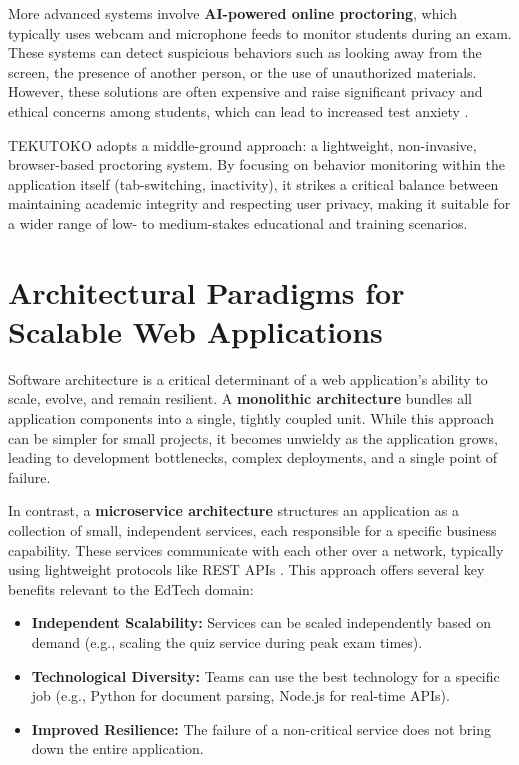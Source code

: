 More advanced systems involve \textbf{AI-powered online proctoring}, which typically uses webcam and microphone feeds to monitor students during an exam. These systems can detect suspicious behaviors such as looking away from the screen, the presence of another person, or the use of unauthorized materials. However, these solutions are often expensive and raise significant privacy and ethical concerns among students, which can lead to increased test anxiety \citep{ullah2021}.

TEKUTOKO adopts a middle-ground approach: a lightweight, non-invasive, browser-based proctoring system. By focusing on behavior monitoring within the application itself (tab-switching, inactivity), it strikes a critical balance between maintaining academic integrity and respecting user privacy, making it suitable for a wider range of low- to medium-stakes educational and training scenarios.

\section{Architectural Paradigms for Scalable Web Applications}
\label{sec:lit-architecture}
Software architecture is a critical determinant of a web application's ability to scale, evolve, and remain resilient. A \textbf{monolithic architecture} bundles all application components into a single, tightly coupled unit. While this approach can be simpler for small projects, it becomes unwieldy as the application grows, leading to development bottlenecks, complex deployments, and a single point of failure.

In contrast, a \textbf{microservice architecture} structures an application as a collection of small, independent services, each responsible for a specific business capability. These services communicate with each other over a network, typically using lightweight protocols like REST APIs \citep{newman2015}. This approach offers several key benefits relevant to the EdTech domain:
\begin{itemize}
    \item \textbf{Independent Scalability:} Services can be scaled independently based on demand (e.g., scaling the quiz service during peak exam times).
    \item \textbf{Technological Diversity:} Teams can use the best technology for a specific job (e.g., Python for document parsing, Node.js for real-time APIs).
    \item \textbf{Improved Resilience:} The failure of a non-critical service does not bring down the entire application.
\end{itemize}

